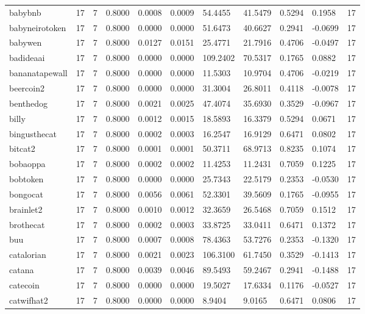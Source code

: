 \begin{table}[htbp]
\begin{tabular}{lllllllllll}
babybnb & 17 & 7 & 0.8000 & 0.0008 & 0.0009 & 54.4455 & 41.5479 & 0.5294 & 0.1958 & 17 \\
babyneirotoken & 17 & 7 & 0.8000 & 0.0000 & 0.0000 & 51.6473 & 40.6627 & 0.2941 & -0.0699 & 17 \\
babywen & 17 & 7 & 0.8000 & 0.0127 & 0.0151 & 25.4771 & 21.7916 & 0.4706 & -0.0497 & 17 \\
badideaai & 17 & 7 & 0.8000 & 0.0000 & 0.0000 & 109.2402 & 70.5317 & 0.1765 & 0.0882 & 17 \\
bananatapewall & 17 & 7 & 0.8000 & 0.0000 & 0.0000 & 11.5303 & 10.9704 & 0.4706 & -0.0219 & 17 \\
beercoin2 & 17 & 7 & 0.8000 & 0.0000 & 0.0000 & 31.3004 & 26.8011 & 0.4118 & -0.0078 & 17 \\
benthedog & 17 & 7 & 0.8000 & 0.0021 & 0.0025 & 47.4074 & 35.6930 & 0.3529 & -0.0967 & 17 \\
billy & 17 & 7 & 0.8000 & 0.0012 & 0.0015 & 18.5893 & 16.3379 & 0.5294 & 0.0671 & 17 \\
bingusthecat & 17 & 7 & 0.8000 & 0.0002 & 0.0003 & 16.2547 & 16.9129 & 0.6471 & 0.0802 & 17 \\
bitcat2 & 17 & 7 & 0.8000 & 0.0001 & 0.0001 & 50.3711 & 68.9713 & 0.8235 & 0.1074 & 17 \\
bobaoppa & 17 & 7 & 0.8000 & 0.0002 & 0.0002 & 11.4253 & 11.2431 & 0.7059 & 0.1225 & 17 \\
bobtoken & 17 & 7 & 0.8000 & 0.0000 & 0.0000 & 25.7343 & 22.5179 & 0.2353 & -0.0530 & 17 \\
bongocat & 17 & 7 & 0.8000 & 0.0056 & 0.0061 & 52.3301 & 39.5609 & 0.1765 & -0.0955 & 17 \\
brainlet2 & 17 & 7 & 0.8000 & 0.0010 & 0.0012 & 32.3659 & 26.5468 & 0.7059 & 0.1512 & 17 \\
brothecat & 17 & 7 & 0.8000 & 0.0002 & 0.0003 & 33.8725 & 33.0411 & 0.6471 & 0.1372 & 17 \\
buu & 17 & 7 & 0.8000 & 0.0007 & 0.0008 & 78.4363 & 53.7276 & 0.2353 & -0.1320 & 17 \\
catalorian & 17 & 7 & 0.8000 & 0.0021 & 0.0023 & 106.3100 & 61.7450 & 0.3529 & -0.1413 & 17 \\
catana & 17 & 7 & 0.8000 & 0.0039 & 0.0046 & 89.5493 & 59.2467 & 0.2941 & -0.1488 & 17 \\
catecoin & 17 & 7 & 0.8000 & 0.0000 & 0.0000 & 19.5027 & 17.6334 & 0.1176 & -0.0527 & 17 \\
catwifhat2 & 17 & 7 & 0.8000 & 0.0000 & 0.0000 & 8.9404 & 9.0165 & 0.6471 & 0.0806 & 17 \\

\end{tabular}
\end{table}
